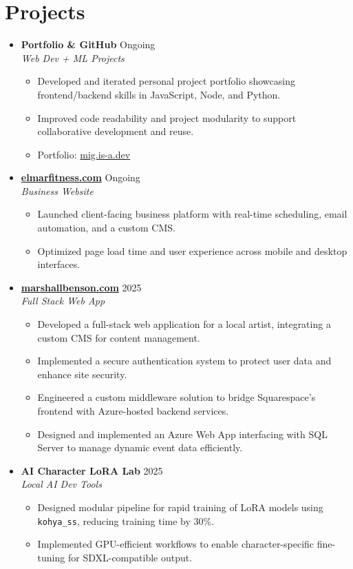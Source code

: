 \documentclass[letterpaper,10pt]{article}
\newcommand{\resumeItem}[1]{\item\small{#1}}
\begin{document}
\section*{Projects}
\begin{itemize}[leftmargin=0in]
  \item[]
    \textbf{Portfolio \& GitHub} \hfill Ongoing \\
    \textit{Web Dev + ML Projects}
    \begin{itemize}[leftmargin=0.15in]
      \resumeItem{Developed and iterated personal project portfolio showcasing frontend/backend skills in JavaScript, Node, and Python.}
      \resumeItem{Improved code readability and project modularity to support collaborative development and reuse.}
      \resumeItem{Portfolio: \href{https://mig.is-a.dev}{mig.is-a.dev}}
    \end{itemize}

  \item[]
    \textbf{\href{https://elmarfitness.com}{elmarfitness.com}} \hfill Ongoing \\
    \textit{Business Website}
    \begin{itemize}[leftmargin=0.15in]
      \resumeItem{Launched client-facing business platform with real-time scheduling, email automation, and a custom CMS.}
      \resumeItem{Optimized page load time and user experience across mobile and desktop interfaces.}
    \end{itemize}

    \item[]
    \textbf{\href{https://marshallbenson.com}{marshallbenson.com}} \hfill 2025 \\
    \textit{Full Stack Web App}
    \begin{itemize}[leftmargin=0.15in]
      \resumeItem{Developed a full-stack web application for a local artist, integrating a custom CMS for content management.}
      \resumeItem{Implemented a secure authentication system to protect user data and enhance site security.}
      \resumeItem{Engineered a custom middleware solution to bridge Squarespace's frontend with Azure-hosted backend services.}
      \resumeItem{Designed and implemented an Azure Web App interfacing with SQL Server to manage dynamic event data efficiently.}
    \end{itemize}
    
  \item[]
    \textbf{AI Character LoRA Lab} \hfill 2025 \\
    \textit{Local AI Dev Tools}
    \begin{itemize}[leftmargin=0.15in]
      \resumeItem{Designed modular pipeline for rapid training of LoRA models using \texttt{kohya\_ss}, reducing training time by 30\%.}
      \resumeItem{Implemented GPU-efficient workflows to enable character-specific fine-tuning for SDXL-compatible output.}
    \end{itemize}
\end{itemize}
\end{document}
